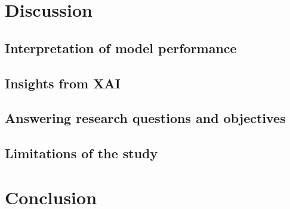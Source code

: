\documentclass[
  pdftex,
  10pt,
  a4paper,
  oneside
]{article}
\begin{document}
  

  

  \newpage

  \section{Discussion}\label{sec:5-discussion}
  

  \subsection{Interpretation of model performance}
  
  

  \subsection{Insights from XAI}
  
  
  

  \subsection{Answering research questions and objectives}

  \subsection{Limitations of the study}

  \newpage

  \section{Conclusion}\label{sec:6-conclusion}

  \newpage

  
  

  \newpage

  
\end{document}
